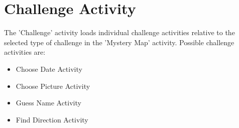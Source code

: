 \section{Challenge Activity}

The 'Challenge' activity loads individual challenge activities relative to the selected type of challenge in the 'Mystery Map' activity. Possible challenge activities are: 

\begin{itemize}
	\item Choose Date Activity
	\item Choose Picture Activity
	\item Guess Name Activity
	\item Find Direction Activity
\end{itemize}

